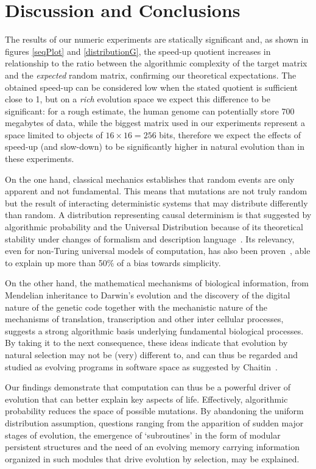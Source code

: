 \documentclass[10pt]{article}
\begin{document}
\section{Discussion and Conclusions}

The results of our numeric experiments are statically significant and, as shown in figures \ref{seqPlot} and \ref{distributionG}, the speed-up quotient increases in relationship to the ratio between the algorithmic complexity of the target matrix and the \textit{expected} random matrix, confirming our theoretical expectations. The obtained speed-up can be considered low when the stated quotient is sufficient close to 1, but on a \textit{rich} evolution space we expect this difference to be significant: for a rough estimate, the human genome can potentially store 700 megabytes of data, while the biggest matrix used in our experiments represent a space limited to objects of $16 \times 16 = 256$ bits, therefore we expect the effects of speed-up (and slow-down) to be significantly higher in natural evolution than in these experiments.

On the one hand, classical mechanics establishes that random events are only apparent and not fundamental. This means that mutations are not truly random but the result of interacting deterministic systems that may distribute differently than random. A distribution representing causal determinism is that suggested by algorithmic probability and the Universal Distribution because of its theoretical stability under changes of formalism and description language~\cite{Solomonof03,kirchherr1997miraculous}. Its relevancy, even for non-Turing universal models of computation, has also been proven~\cite{codTeoDist}, able to explain up more than 50\% of a bias towards simplicity.

On the other hand, the mathematical mechanisms of biological information, from Mendelian inheritance to Darwin's evolution and the discovery of the digital nature of the genetic code together with the mechanistic nature of the mechanisms of translation, transcription and other inter cellular processes, suggests a strong algorithmic basis underlying fundamental biological processes. By taking it to the next consequence, these ideas indicate that evolution by natural selection may not be (very) different to, and can thus be regarded and studied as evolving programs in software space as suggested by Chaitin~\cite{chaitin:EvolofMutaSoft,ChaitinEvolvingSoftware,newKindScience}.

Our findings demonstrate that computation can thus be a powerful  driver of evolution that can better explain key aspects of life. Effectively, algorithmic probability reduces the space of possible mutations. By abandoning the uniform distribution assumption, questions ranging from the apparition of sudden major stages of evolution, the emergence of `subroutines' in the form of modular persistent structures and the need of an evolving memory carrying information organized in such modules that drive evolution by selection, may be explained. 
\end{document}
